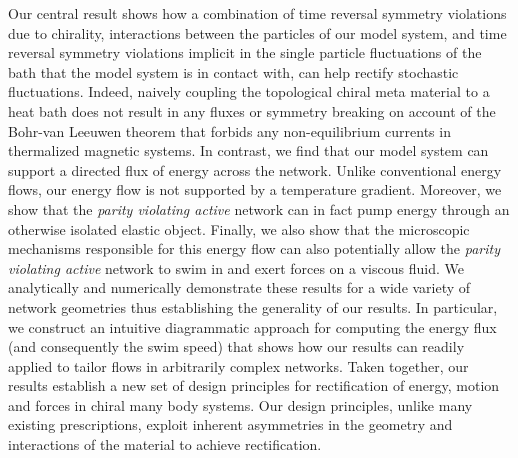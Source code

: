 \documentclass[
 preprint,
 preprintnumbers,
 amsmath,amssymb,
 aps,
 pre,
 longbibliography,
 superscriptaddress,
 10pt, twocolumn
]{revtex4-1}
\begin{document}
Our central result shows how a combination of time reversal symmetry violations due to chirality, interactions between the particles of our model system, and time reversal symmetry violations implicit in the single particle fluctuations of the bath that the model system is in contact with, can help rectify stochastic fluctuations. Indeed, naively coupling the topological chiral meta material to a heat bath does not result in any fluxes or symmetry breaking on account of the Bohr-van Leeuwen theorem that forbids any non-equilibrium currents in thermalized magnetic systems. In contrast, we find that our model system can support a directed flux of energy across the network. Unlike conventional energy flows, our energy flow is not supported by a temperature gradient. Moreover, we show that the \textit{parity violating active} network can in fact pump energy through an otherwise isolated elastic object. Finally, we also show that the microscopic mechanisms responsible for this energy flow can also potentially allow the \textit{parity violating active} network to swim in and exert forces on a viscous fluid. We analytically and numerically demonstrate these results for a wide variety of network geometries thus establishing the generality of our results. In particular, we construct an intuitive diagrammatic approach for computing the energy flux (and consequently the swim speed) that shows how our results can readily applied to tailor flows in arbitrarily complex networks. Taken together, our results establish a new set of design principles for rectification of energy, motion and forces in chiral many body systems. Our design principles, unlike many existing prescriptions, exploit inherent asymmetries in the geometry and interactions of the material to achieve rectification.





\end{document}
